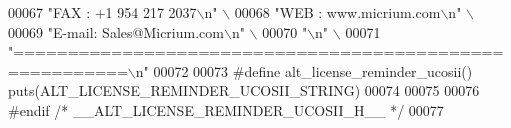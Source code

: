 \begin{DoxyCode}
00067 \textcolor{preprocessor}{    "FAX   : +1 954 217 2037\(\backslash\)n"                                                \(\backslash\)}
00068 \textcolor{preprocessor}{    "WEB   : www.micrium.com\(\backslash\)n"                                                \(\backslash\)}
00069 \textcolor{preprocessor}{    "E-mail: Sales@Micrium.com\(\backslash\)n"                                              \(\backslash\)}
00070 \textcolor{preprocessor}{    "\(\backslash\)n"                                                                       \(\backslash\)}
00071 \textcolor{preprocessor}{    "========================================================\(\backslash\)n"}
00072 
00073 \textcolor{preprocessor}{#define alt\_license\_reminder\_ucosii() puts(ALT\_LICENSE\_REMINDER\_UCOSII\_STRING)}
00074 
00075 
00076 \textcolor{preprocessor}{#endif }\textcolor{comment}{/* \_\_ALT\_LICENSE\_REMINDER\_UCOSII\_H\_\_ */}\textcolor{preprocessor}{}
00077 
\end{DoxyCode}
